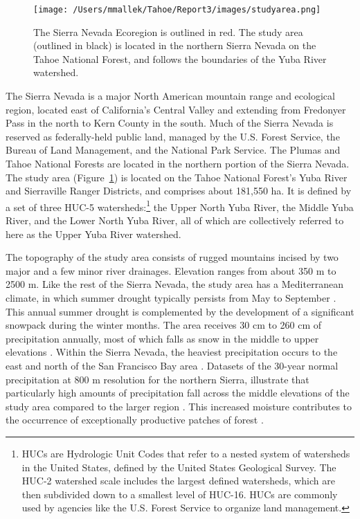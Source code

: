 \begin{figure}[!htbp]
\texttt{[image: /Users/mmallek/Tahoe/Report3/images/studyarea.png]}
\caption{The Sierra Nevada Ecoregion is outlined in red. The study area (outlined in black) is located in the northern Sierra Nevada on the Tahoe National Forest, and follows the boundaries of the Yuba River watershed.}
\label{projectarea}
\end{figure}

The Sierra Nevada is a major North American mountain range and ecological region, located east of California's Central Valley and extending from Fredonyer Pass in the north to Kern County in the south. Much of the Sierra Nevada is reserved as federally-held public land, managed by the U.S. Forest Service, the Bureau of Land Management, and the National Park Service. The Plumas and Tahoe National Forests are located in the northern portion of the Sierra Nevada. The study area (Figure~\ref{projectarea}) is located on the Tahoe National Forest's Yuba River and Sierraville Ranger Districts, and comprises about 181,550 ha. It is defined by a set of three HUC-5 watersheds:\footnote{HUCs are Hydrologic Unit Codes that refer to a nested system of watersheds in the United States, defined by the United States Geological Survey. The HUC-2 watershed scale includes the largest defined watersheds, which are then subdivided down to a smallest level of HUC-16. HUCs are commonly used by agencies like the U.S. Forest Service to organize land management.} the Upper North Yuba River, the Middle Yuba River, and the Lower North Yuba River, all of which are collectively referred to here as the Upper Yuba River watershed. 

The topography of the study area consists of rugged mountains incised by two major and a few minor river drainages. Elevation ranges from about 350 m to 2500 m. Like the rest of the Sierra Nevada, the study area has a Mediterranean climate, in which summer drought typically persists from May to September \citep{Minnich2007,Skinner1996}. This annual summer drought is complemented by the development of a significant snowpack during the winter months. The area receives 30 cm to 260 cm of precipitation annually, most of which falls as snow in the middle to upper elevations \citep{Storer1963}. Within the Sierra Nevada, the heaviest precipitation occurs to the east and north of the San Francisco Bay area \citep{VanWag2006}. Datasets of the 30-year normal precipitation at 800 m resolution for the northern Sierra, illustrate that particularly high amounts of precipitation fall across the middle elevations of the study area compared to the larger region \citep{PRISMClimateGroup2004}. This increased moisture contributes to the occurrence of exceptionally productive patches of forest \citep[][ Alan Doerr, personal communication]{Littell2012}.




